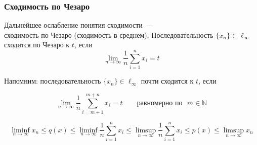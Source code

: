 \begin{frame}\frametitle{Сходимость по Чезаро}
	\label{page:p_q_multiples}
	Дальнейшее ослабление понятия сходимости~---
	\\
	сходимость по Чезаро (сходимость в среднем).
	\vfill
	Последовательность $\{x_n\}\in\ell_\infty$ сходится по Чезаро к $t$, если
	\begin{equation}
		\lim_{n\to\infty}\frac1{n}\sum_{i=1}^n x_i = t
	\end{equation}

	Напомним: последовательность $\{x_n\}\in\ell_\infty$ почти сходится к $t$, если

	\begin{equation}
			\lim_{n\to\infty}  \frac1{n}\sum_{i=m+1}^{m+n} x_i = t
			\qquad
			\mbox{равномерно по~~}
			m\in\mathbb{N}
	\end{equation}

	\vfill

	\begin{equation}
		\label{eq:generalization_of_limits}
		\liminf_{n\to\infty} x_n \leq q(x) \leq \liminf_{n\to\infty}\frac1{n}\sum_{i=1}^n x_i
		\leq
		\limsup_{n\to\infty}\frac1{n}\sum_{i=1}^n x_i
		\leq p(x)
		\leq \limsup_{n\to\infty} x_n
	\end{equation}

\end{frame}

